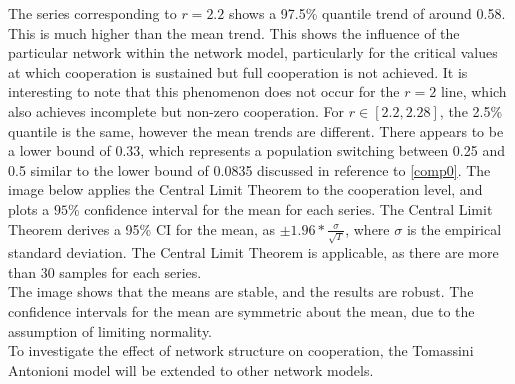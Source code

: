 \FloatBarrier
{}
\FloatBarrier
The series corresponding to $r=2.2$ shows a 97.5\% quantile trend of around 0.58. This is much higher than the mean trend. This shows the influence of the particular network within the network model, particularly for the critical values at which cooperation is sustained but full cooperation is not achieved. It is interesting to note that this phenomenon does not occur for the $r=2$ line, which also achieves incomplete but non-zero cooperation. For $r \in [2.2, 2.28]$, the 2.5\% quantile is the same, however the mean trends are different. There appears to be a lower bound of 0.33, which represents a population switching between 0.25 and 0.5 similar to the lower bound of 0.0835 discussed in reference to \ref{comp0}. The image below applies the Central Limit Theorem to the cooperation level, and plots a $95\%$ confidence interval for the mean for each series. The Central Limit Theorem derives a 95\% CI for the mean, as $\pm 1.96*\frac{\sigma}{\sqrt{T}}$, where $\sigma$ is the empirical standard deviation. The Central Limit Theorem is applicable, as there are more than 30 samples for each series. \\
\FloatBarrier
{}
\FloatBarrier
The image shows that the means are stable, and the results are robust. The confidence intervals for the mean are symmetric about the mean, due to the assumption of limiting normality. \\

To investigate the effect of network structure on cooperation, the Tomassini Antonioni model will be extended to other network models. \\

